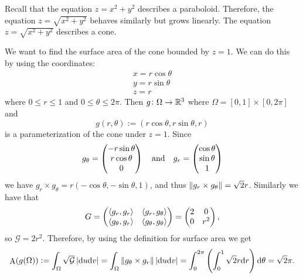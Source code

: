\documentclass[11pt,a4paper]{article}
\DeclareMathOperator{\A}{A} %
\begin{document}
\begin{example}
  Recall that the equation $z = x^2 + y^2$ describes a paraboloid.
  Therefore, the equation $z = \sqrt{x^2 + y^2}$ behaves similarly
  but grows linearly.
  The equation $z = \sqrt{x^2 + y^2}$ describes a cone.
  
  We want to find the surface area of the cone bounded by $z = 1$.
  We can do this by using the coordinates:
  \begin{gather*}
    x = r \cos \theta \\
    y = r \sin \theta \\
    z = r
  \end{gather*}
  where $0 \le r \le 1$ and $0 \le \theta \le 2\pi$.
  Then $g \colon \Omega \to \mathbb{R}^3$ where $\Omega = [0,1] \times [0,2\pi]$
  and
  \[
    g(r,\theta) := (r \cos \theta, r \sin \theta, r)
  \]
  is a parameterization of the cone under $z = 1$.
  Since
  \[
    g_{\theta} =
    \begin{pmatrix}
      -r \sin \theta \\
      r \cos \theta \\
      0
    \end{pmatrix} \quad \text{and} \quad
    g_{r} =
    \begin{pmatrix}
      \cos \theta \\
      \sin \theta \\
      1
    \end{pmatrix}
  \]
  we have $g_{r} \times g_{\theta} = r(-\cos \theta, -\sin \theta, 1)$,
  and thus $\left\lVert g_{r} \times g_{\theta}\right\rVert = \sqrt{2} r$.
  Similarly we have that
  \[
    G =
    \begin{pmatrix}
      \left\langle g_{r}, g_{r} \right\rangle & \left\langle g_{r}, g_{\theta} \right\rangle \\
      \left\langle g_{\theta}, g_{r} \right\rangle & \left\langle g_{\theta}, g_{\theta} \right\rangle
    \end{pmatrix} =
    \begin{pmatrix}
      2 & 0 \\
      0 & r^2
    \end{pmatrix}, 
  \]
  so $\mathcal G = 2r^2$.
  Therefore, by using the definition for surface area we get
  \[
    \A(g(\Omega)) :=
    \int_{\Omega} \sqrt{\mathcal G} \abs{\du \dv} =
    \int_{\Omega} \norm{g_{\theta} \times g_{r}} \abs{\du \dv} =
    \int_{0}^{2\pi} \del{\int_{0}^{1} \sqrt{2} r \dr} \dtheta = \sqrt{2} \pi.
  \]
\end{example}
\end{document}
